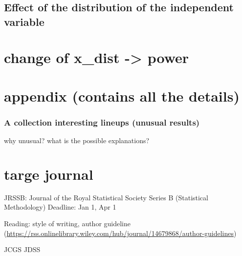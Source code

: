 \documentclass[]{interact}
\theoremstyle{plain}%
\theoremstyle{definition}
\theoremstyle{remark}
\begin{document}
\hypertarget{effect-of-the-distribution-of-the-independent-variable}{%
\subsection{Effect of the distribution of the independent
variable}\label{effect-of-the-distribution-of-the-independent-variable}}

\hypertarget{change-of-x_dist---power}{%
\section{change of x\_dist -\textgreater{}
power}\label{change-of-x_dist---power}}

\hypertarget{appendix-contains-all-the-details}{%
\section{appendix (contains all the
details)}\label{appendix-contains-all-the-details}}

\hypertarget{a-collection-interesting-lineups-unusual-results}{%
\subsubsection{A collection interesting lineups (unusual
results)}\label{a-collection-interesting-lineups-unusual-results}}

why unusual? what is the possible explanations?

\hypertarget{targe-journal}{%
\section{targe journal}\label{targe-journal}}

JRSSB: Journal of the Royal Statistical Society Series B (Statistical
Methodology) Deadline: Jan 1, Apr 1

Reading: style of writing, author guideline
(\url{https://rss.onlinelibrary.wiley.com/hub/journal/14679868/author-guidelines})

JCGS JDSS



\end{document}
